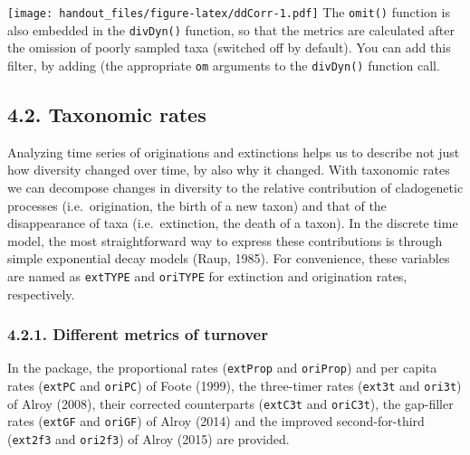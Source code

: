 \documentclass[]{article}
\begin{document}
\texttt{[image: handout\_files/figure-latex/ddCorr-1.pdf]} The
\texttt{omit()} function is also embedded in the \texttt{divDyn()}
function, so that the metrics are calculated after the omission of
poorly sampled taxa (switched off by default). You can add this filter,
by adding (the appropriate \texttt{om} arguments to the
\texttt{divDyn()} function call.

\subsection{4.2. Taxonomic rates}\label{taxonomic-rates}

Analyzing time series of originations and extinctions helps us to
describe not just how diversity changed over time, by also why it
changed. With taxonomic rates we can decompose changes in diversity to
the relative contribution of cladogenetic processes (i.e.~origination,
the birth of a new taxon) and that of the disappearance of taxa
(i.e.~extinction, the death of a taxon). In the discrete time model, the
most straightforward way to express these contributions is through
simple exponential decay models (Raup, 1985). For convenience, these
variables are named as \texttt{extTYPE} and \texttt{oriTYPE} for
extinction and origination rates, respectively.

\subsubsection{4.2.1. Different metrics of
turnover}\label{different-metrics-of-turnover}

In the package, the proportional rates (\texttt{extProp} and
\texttt{oriProp}) and per capita rates (\texttt{extPC} and
\texttt{oriPC}) of Foote (1999), the three-timer rates (\texttt{ext3t}
and \texttt{ori3t}) of Alroy (2008), their corrected counterparts
(\texttt{extC3t} and \texttt{oriC3t}), the gap-filler rates
(\texttt{extGF} and \texttt{oriGF}) of Alroy (2014) and the improved
second-for-third (\texttt{ext2f3} and \texttt{ori2f3}) of Alroy (2015)
are provided.
\end{document}
